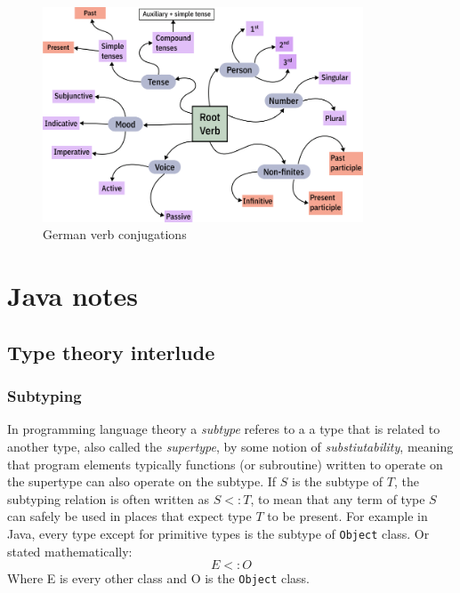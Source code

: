 \documentclass[a4paper]{article}
\begin{document}
\begin{figure}
    \centering
    \includegraphics[width=0.85\textwidth]{graphics/german-verb-conjugation.png}
    \caption{German verb conjugations}
\end{figure}

\section*{Java notes}

\subsection*{Type theory interlude}

\subsubsection*{Subtyping}

In programming language theory a \emph{subtype} referes to a a type that is related to another type, also called the 
\emph{supertype}, by some notion of \emph{substiutability}, meaning that program elements typically functions (or subroutine)
written to operate on the supertype can also operate on the subtype. If \(S\) is the subtype of \(T\), the subtyping relation
is often written as \(S <: T\), to mean that any term of type \(S\) can safely be used in places that expect type \(T\) to be
present. For example in Java, every type except for primitive types is the subtype of \lstinline{Object} class. Or stated
mathematically:
\[
    E <: O  
\]
Where E is every other class and O is the \lstinline{Object} class. 
\end{document}
